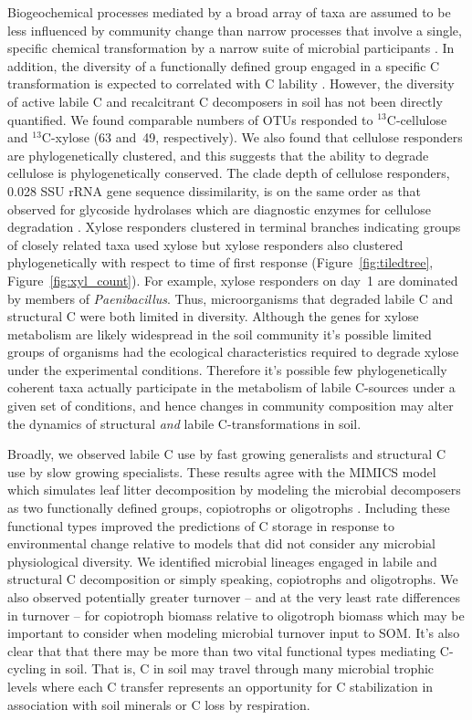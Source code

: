 Biogeochemical processes mediated by a broad array of taxa are assumed to
be less influenced by community change than narrow processes that involve
a single, specific chemical transformation by a narrow suite of microbial
participants \citep{Schimel_1995,McGuire2010}. In addition, the diversity of
a functionally defined group engaged in a specific C transformation is expected
to correlated with C lability \citep{McGuire2010}. However, the diversity of
active labile C and recalcitrant C decomposers in soil has not been directly
quantified. We found comparable numbers of OTUs responded to $^{13}$C-cellulose
and $^{13}$C-xylose (63 and~49, respectively). We also found that cellulose
responders are phylogenetically clustered, and this suggests that the ability
to degrade cellulose is phylogenetically conserved. The clade depth of
cellulose responders, 0.028 SSU rRNA gene sequence dissimilarity, is on the
same order as that observed for glycoside hydrolases which are diagnostic
enzymes for cellulose degradation \citep{Berlemont2013}. Xylose responders
clustered in terminal branches indicating groups of closely related taxa used
xylose but xylose responders also clustered phylogenetically with respect to
time of first response (Figure~\ref{fig:tiledtree},
Figure~\ref{fig:xyl_count}). For example, xylose responders on day~1 are
dominated by members of \textit{Paenibacillus}. Thus, microorganisms that
degraded labile C and structural C were both limited in diversity. Although the
genes for xylose metabolism are likely widespread in the soil
community it's possible limited groups of organisms had the ecological
characteristics required to degrade xylose under the experimental conditions.
Therefore it's possible few phylogenetically coherent taxa actually participate
in the metabolism of labile C-sources under a given set of conditions, and
hence changes in community composition may alter the dynamics of structural
\textit{and} labile C-transformations in soil.

Broadly, we observed labile C use by fast growing generalists and structural
C use by slow growing specialists. These results agree with the MIMICS model
which simulates leaf litter decomposition by modeling the microbial decomposers
as two functionally defined groups, copiotrophs or oligotrophs
\citep{wieder_2014a}. Including these functional types improved the predictions
of C storage in response to environmental change relative to models that did
not consider any microbial physiological diversity. We identified microbial
lineages engaged in labile and structural C decomposition or simply speaking,
copiotrophs and oligotrophs. We also observed potentially greater turnover --
and at the very least rate differences in turnover -- for copiotroph biomass
relative to oligotroph biomass which may be important to consider when modeling
microbial turnover input to SOM. It's also clear that that there may be more
than two vital functional types mediating C-cycling in soil. That is, C in soil
may travel through many microbial trophic levels where each C transfer
represents an opportunity for C stabilization in association with soil minerals
or C loss by respiration.

